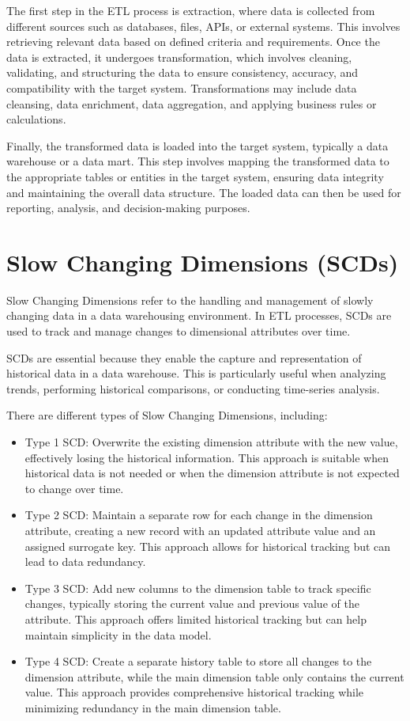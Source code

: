 \documentclass[]{report}
\begin{document}
The first step in the ETL process is extraction, where data is collected from different sources such as databases, files, APIs, or external systems. This involves retrieving relevant data based on defined criteria and requirements. Once the data is extracted, it undergoes transformation, which involves cleaning, validating, and structuring the data to ensure consistency, accuracy, and compatibility with the target system. Transformations may include data cleansing, data enrichment, data aggregation, and applying business rules or calculations.

Finally, the transformed data is loaded into the target system, typically a data warehouse or a data mart. This step involves mapping the transformed data to the appropriate tables or entities in the target system, ensuring data integrity and maintaining the overall data structure. The loaded data can then be used for reporting, analysis, and decision-making purposes.

\section{Slow Changing Dimensions (SCDs)}

Slow Changing Dimensions refer to the handling and management of slowly changing data in a data warehousing environment. In ETL processes, SCDs are used to track and manage changes to dimensional attributes over time.

SCDs are essential because they enable the capture and representation of historical data in a data warehouse. This is particularly useful when analyzing trends, performing historical comparisons, or conducting time-series analysis.

There are different types of Slow Changing Dimensions, including:

\begin{itemize}
	\item Type 1 SCD: Overwrite the existing dimension attribute with the new value, effectively losing the historical information. This approach is suitable when historical data is not needed or when the dimension attribute is not expected to change over time.
	
	\item Type 2 SCD: Maintain a separate row for each change in the dimension attribute, creating a new record with an updated attribute value and an assigned surrogate key. This approach allows for historical tracking but can lead to data redundancy.
	
	\item Type 3 SCD: Add new columns to the dimension table to track specific changes, typically storing the current value and previous value of the attribute. This approach offers limited historical tracking but can help maintain simplicity in the data model.
	
	\item Type 4 SCD: Create a separate history table to store all changes to the dimension attribute, while the main dimension table only contains the current value. This approach provides comprehensive historical tracking while minimizing redundancy in the main dimension table.
\end{itemize}
\end{document}
